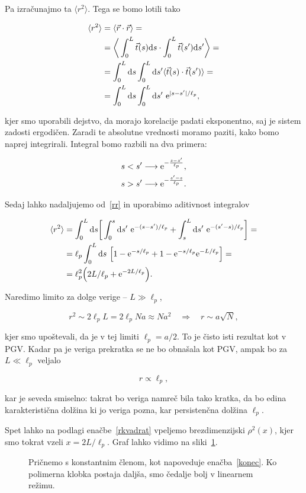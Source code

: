 \documentclass[12pt, a4 paper]{article}
\newcommand{\rr}{
	\ensuremath{\langle r^2 \rangle}
}
\renewcommand{\d}{
	\ensuremath{\mathrm{d}}
}
\newcommand{\e}{
	\ensuremath{\mathrm{e}}
}
\begin{document}
Pa izra\v cunajmo ta $\rr$. Tega se bomo lotili tako

\begin{align}
	\rr &= \langle \vec{r} \cdot \vec{r} \rangle = \notag \\
	&= \bigg\langle \int_0^L \vec{t}(s) \d s \cdot \int_0^L \vec{t}(s')\d s'\bigg\rangle = \notag \\
	&= \int_0^L\d s\int_0^L\d s' \langle \vec{t}(s) \cdot \vec{t}(s') \rangle = \notag \\
	&= \int_0^L \d s\int_0^L \d s'\ \e^{|s - s'|/\ell_p}, \label{rr}
\end{align}

kjer smo uporabili dejstvo, da morajo korelacije padati eksponentno, saj je sistem zadosti ergodi\v cen. Zaradi te
absolutne vrednosti moramo paziti, kako bomo naprej integrirali. Integral bomo razbili na dva primera:

\begin{align}
	s < s' &\longrightarrow \e^{-\frac{s - s'}{\ell_p}}, \notag \\
	s > s' &\longrightarrow \e^{-\frac{s' - s}{\ell_p}}. \notag
\end{align}

Sedaj lahko nadaljujemo od~\eqref{rr} in uporabimo aditivnost integralov

\begin{align}
	\rr &= \int_0^L\d s\bigg[\int_0^s \d s'\ \e^{-(s - s')/\ell_p} + \int_s^L \d s'\ \e^{-(s' -
		s)/\ell_p}\bigg] = \notag \\
	&= \ell_p \int_0^L \d s\ \Big[1 - \e^{-s/\ell_p} + 1 - \e^{-s/\ell_p}\e^{-L/\ell_p}\Big] = \notag \\
	&= \ell_p^2 \Big(2L/\ell_p + \e^{-2L/\ell_p}\Big).
\end{align}

Naredimo limito za dolge verige -- $L \gg \ell_p$,

\begin{equation}
	r^2 \sim 2\ell_p L = 2\ell_p N a \approx Na^2 \quad \Longrightarrow \quad r \sim a\sqrt{N},
	\label{rkvadrat}
\end{equation}

kjer smo upo\v stevali, da je v tej limiti $\ell_p = a/2$. To je \v cisto isti rezultat kot v PGV. Kadar pa je
veriga prekratka se ne bo obna\v sala kot PGV, ampak bo za $L \ll \ell_p$ veljalo

\begin{equation}
	r \propto \ell_p,
	\label{konec}
\end{equation}

kar je seveda smiselno: takrat bo veriga namre\v c bila tako kratka, da bo edina karakteristi\v cna dol\v zina
ki jo veriga pozna, kar persisten\v cna dol\v zina $\ell_p$.

Spet lahko na podlagi ena\v cbe~\eqref{rkvadrat} vpeljemo brezdimenzijski $\rho^2(x)$, kjer smo tokrat vzeli
$x = 2L/\ell_p$. Graf lahko vidimo na sliki~\ref{fig2}.

\begin{figure}[H]\centering
	
	\caption{Pri\v cnemo s konstantnim \v clenom, kot napoveduje ena\v cba~\eqref{konec}. Ko
		polimerna klobka postaja dalj\v sa, smo \v cedalje bolj v linearnem re\v zimu.}
	\label{fig2}
\end{figure}
\end{document}
